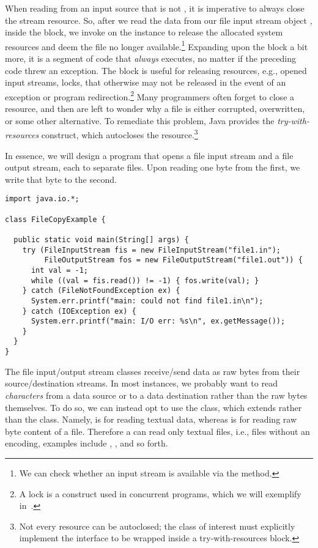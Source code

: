 When reading from an input source that is not , it is imperative to always close the stream resource.
So, after we read the data from our file input stream object , inside the  block, we invoke  on the instance to release the allocated system resources and deem the file no longer available.\footnote{We can check whether an input stream is available via the  method.} 
Expanding upon the  block a bit more, it is a segment of code that \emph{always} executes, no matter if the preceding code threw an exception. 
The  block is useful for releasing resources, e.g., opened input streams, locks, that otherwise may not be released in the event of an exception or program redirection.\footnote{A lock is a construct used in concurrent programs, which we will exemplify in~.} 
Many programmers often forget to close a resource, and then are left to wonder why a file is either corrupted, overwritten, or some other alternative. 
To remediate this problem, Java provides the \emph{try-with-resources} construct, which autocloses the resource.\footnote{Not every resource can be autoclosed; the class of interest must explicitly implement the  interface to be wrapped inside a try-with-resources block.}

In essence, we will design a program that opens a file input stream and a file output stream, each to separate files. Upon reading one byte from the first, we write that byte to the second.

\begin{lstlisting}[language=MyJava]
import java.io.*;

class FileCopyExample {

  public static void main(String[] args) {
    try (FileInputStream fis = new FileInputStream("file1.in");
         FileOutputStream fos = new FileOutputStream("file1.out")) {
      int val = -1;
      while ((val = fis.read()) != -1) { fos.write(val); }
    } catch (FileNotFoundException ex) {
      System.err.printf("main: could not find file1.in\n");
    } catch (IOException ex) {
      System.err.printf("main: I/O err: %s\n", ex.getMessage());
    }
  }
}
\end{lstlisting}

The file input/output stream classes receive/send data as raw bytes from their source/destination streams.
In most instances, we probably want to read \emph{characters} from a data source or to a data destination rather than the raw bytes themselves.
To do so, we can instead opt to use the  class, which extends  rather than the  class. 
Namely,  is for reading textual data, whereas  is for reading raw byte content of a file. 
Therefore a  can read only textual files, i.e., files without an encoding, examples include , , and so forth.

